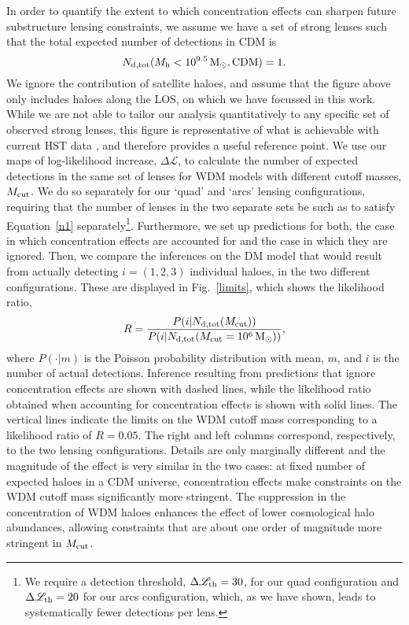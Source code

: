 \documentclass[a4paper, fleqn, usenatbib, useAMS]{mnras}
\def\DL{\Delta\mathscr{L}}
\begin{document}
In order to quantify the extent to which concentration effects can sharpen 
future substructure lensing constraints, 
we assume we have a set of strong lenses such that the total expected number of detections in CDM is 
%
\begin{equation}
N_{\rm d, tot}(M_{\rm h}<10^{9.5}\,\textrm{M}_{\rm \odot}, {\rm CDM})
=1. 
\label{n1}
\end{equation}
%
We ignore the contribution of satellite haloes, and assume that the figure above
only includes haloes along the LOS, on which we have focussed in this work.
While we are not able to tailor our analysis quantitatively to any specific set of observed strong lenses, 
this figure is representative of what is achievable with current HST data \citep{Vegetti2018,Ritondale2019}, 
and therefore provides a useful reference point. 
We use our maps of log-likelihood increase, $\DL$, to calculate the number of expected detections in the 
same set of lenses for WDM models with different cutoff masses, $M_{\rm cut}$. 
We do so separately for our `quad' and `arcs' lensing configurations,
requiring that the number of lenses in the two separate sets  be such
as to satisfy Equation~\ref{n1} separately\footnote{
We require a detection threshold, $\DL_{\rm th}=30$, for our quad
configuration and $\DL_{\rm th}=20$ 
for our arcs configuration, which, as we have shown, leads to systematically fewer detections 
per lens.}. Furthermore, we set up predictions for both, the case in which concentration effects are accounted for
and the case in which they are ignored. Then, we compare the inferences on the DM model that would result
 from actually detecting $i = (1, 2, 3)$ individual haloes, in the two
 different configurations. These are displayed in Fig.~\ref{limits}, which
 shows the likelihood ratio, 
%
\begin{equation}
R = {{P( i | N_{\rm d, tot}(M_{\rm cut}))}\over {P( i | N_{\rm d, tot}(M_{\rm cut}=10^6 \, {\rm M_\odot}))}},
\label{likratio}
\end{equation}
%
where $P(\cdot|m)$ is the Poisson probability distribution with mean, $m$, and $i$ is the number of actual 
detections. Inference resulting from predictions that ignore
concentration effects are shown with dashed lines, while 
the likelihood ratio obtained when accounting for concentration
effects is shown with solid lines. The vertical 
lines indicate the limits on the WDM cutoff mass corresponding to a likelihood ratio of $R=0.05$. 
The right and left columns correspond, respectively, 
to the two lensing configurations.  Details are only marginally  different and the magnitude of the effect is very similar in the two cases:
at fixed number of expected haloes in a CDM universe, concentration effects make
constraints on the WDM cutoff mass significantly more stringent. The suppression in the 
concentration of WDM haloes enhances the effect of lower cosmological halo abundances,
allowing constraints that are about one order of magnitude more
stringent in $M_{\rm cut}$.
\end{document}
